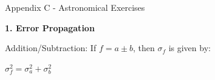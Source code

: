 \documentclass[12pt]{article}
\begin{document}




\newpage

\centerline{\Huge Appendix C - Astronomical Exercises}

\begin{center}
{\large{\bf 1. Error Propagation}}
\end{center}

\noindent
Addition/Subtraction: If $f=a\pm b$, then $\sigma_f$ is given by:
\begin{center}
\Large {$\sigma^2_{f} = \sigma_a^2 + \sigma_b^2$}
\end{center}

\bigskip
\end{document}
